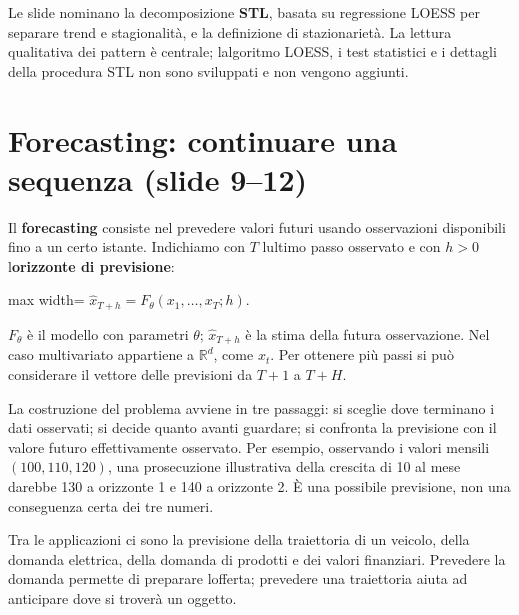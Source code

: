 \documentclass[11pt,a4paper,oneside,openany]{book}
\renewenvironment{quote}{\list{}{\leftmargin=1em\rightmargin=0pt}\item\relax}{\endlist}
\begin{document}
\begin{quote}
Le slide nominano la decomposizione \textbf{STL}, basata su regressione LOESS per separare trend e stagionalità, e la definizione di stazionarietà. La lettura qualitativa dei pattern è centrale; l\textquotesingle algoritmo LOESS, i test statistici e i dettagli della procedura STL non sono sviluppati e non vengono aggiunti.
\end{quote}

\section{Forecasting: continuare una sequenza (slide 9--12)}\label{f03-r106}

Il \textbf{forecasting} consiste nel prevedere valori futuri usando osservazioni disponibili fino a un certo istante. Indichiamo con \(T\) l\textquotesingle ultimo passo osservato e con \(h>0\) l\textquotesingle{}\textbf{orizzonte di previsione}:

\begin{center}
\begin{adjustbox}{max width=\linewidth}
$\displaystyle \boxed{\widehat x_{T+h}=F_\theta(x_1,\ldots,x_T;h).}$
\end{adjustbox}
\end{center}

\(F_\theta\) è il modello con parametri \(\theta\); \(\widehat x_{T+h}\) è la stima della futura osservazione. Nel caso multivariato appartiene a \(\mathbb R^d\), come \(x_t\). Per ottenere più passi si può considerare il vettore delle previsioni da \(T+1\) a \(T+H\).

La costruzione del problema avviene in tre passaggi: si sceglie dove terminano i dati osservati; si decide quanto avanti guardare; si confronta la previsione con il valore futuro effettivamente osservato. Per esempio, osservando i valori mensili \((100,110,120)\), una prosecuzione illustrativa della crescita di 10 al mese darebbe 130 a orizzonte 1 e 140 a orizzonte 2. È una possibile previsione, non una conseguenza certa dei tre numeri.

Tra le applicazioni ci sono la previsione della traiettoria di un veicolo, della domanda elettrica, della domanda di prodotti e dei valori finanziari. Prevedere la domanda permette di preparare l\textquotesingle offerta; prevedere una traiettoria aiuta ad anticipare dove si troverà un oggetto.
\end{document}
